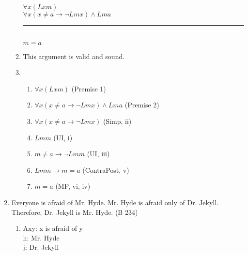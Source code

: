 \documentclass{article}
\begin{document}
\begin{enumerate}
\begin{enumerate}
                        $\forall x(Lxm)$\\
                        $\forall x(x \neq a \to \neg Lmx) \land Lma$\\
                        \rule{15em}{.5pt}\\
                        $m=a$
                  \item This argument is valid and sound.
                        \setcounter{enumii}{3}
                  \item \begin{enumerate}
                              \item $\forall x(Lxm)$ (Premise 1)
                              \item $\forall x(x \neq a \to \neg Lmx) \land Lma$ (Premise 2)
                              \item $\forall x(x \neq a \to \neg Lmx)$ (Simp, ii)
                              \item $Lmm$ (UI, i)
                              \item $m \neq a \to \neg Lmm$ (UI, iii)
                              \item $Lmm \to m = a$ (ContraPost, v)
                              \item $m = a$ (MP, vi, iv)
                        \end{enumerate}
            \end{enumerate}
      \item Everyone is afraid of Mr. Hyde. Mr. Hyde is afraid only of Dr. Jekyll. Therefore, Dr. Jekyll is Mr. Hyde. (B 234)
            \begin{enumerate}
                  \item Axy: x is afraid of y\\
                        h: Mr. Hyde\\
                        j: Dr. Jekyll\\


\end{enumerate}
\end{enumerate}
\end{document}
